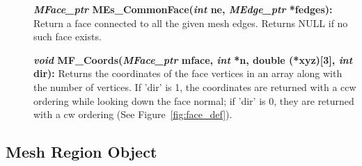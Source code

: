 \documentclass[12pt]{article}
\begin{document}
\begin{description}
\item[]\textbf{\textit{MFace\_ptr} MEs\_CommonFace(\textit{int} ne,
    \textit{MEdge\_ptr} *fedges):} Return a face connected to all
  the given mesh edges. Returns NULL if no such face exists.


\item[]

\item[]\textbf{\textit{void} MF\_Coords(\textit{MFace\_ptr} mface,
\textit{int} *n, double (*xyz)[3], \textit{int} dir):} Returns the
coordinates of the face vertices in an array along with the number of
vertices. If 'dir' is 1, the coordinates are returned with a  ccw
ordering while looking down the face normal; if 'dir' is 0, they are
returned with a cw ordering (See Figure~\ref{fig:face_def}).
\end{description}

\newpage
\subsection{Mesh Region Object}
\end{document}
